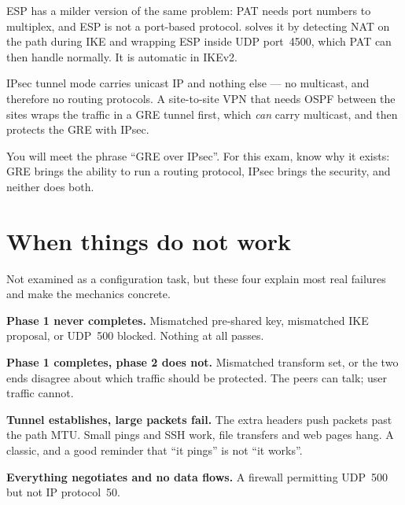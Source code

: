 ESP has a milder version of the same problem: PAT needs port numbers to
multiplex, and ESP is not a port-based protocol.  solves it by
detecting NAT on the path during IKE and wrapping ESP inside UDP port~4500, which
PAT can then handle normally. It is automatic in IKEv2.

\begin{conceptbox}
IPsec tunnel mode carries unicast IP and nothing else --- no multicast, and
therefore no routing protocols. A site-to-site VPN that needs OSPF between the
sites wraps the traffic in a GRE tunnel first, which \emph{can} carry multicast,
and then protects the GRE with IPsec.

You will meet the phrase ``GRE over IPsec''. For this exam, know why it exists:
GRE brings the ability to run a routing protocol, IPsec brings the security, and
neither does both.
\end{conceptbox}

\section{When things do not work}

Not examined as a configuration task, but these four explain most real failures
and make the mechanics concrete.

\begin{tight}
  \item \textbf{Phase 1 never completes.} Mismatched pre-shared key, mismatched
        IKE proposal, or UDP~500 blocked. Nothing at all passes.
  \item \textbf{Phase 1 completes, phase 2 does not.} Mismatched transform set,
        or the two ends disagree about which traffic should be protected. The
        peers can talk; user traffic cannot.
  \item \textbf{Tunnel establishes, large packets fail.} The extra headers push
        packets past the path MTU. Small pings and SSH work, file transfers and
        web pages hang. A classic, and a good reminder that ``it pings'' is not
        ``it works''.
  \item \textbf{Everything negotiates and no data flows.} A firewall permitting
        UDP~500 but not IP protocol~50.
\end{tight}


